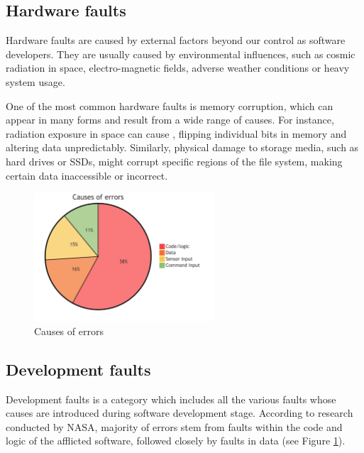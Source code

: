 \subsection{Hardware faults}

Hardware faults are caused by external factors beyond our control as software developers. They are usually caused by environmental influences, such as cosmic radiation in space, electro-magnetic fields, adverse weather conditions or heavy system usage.

One of the most common hardware faults is memory corruption, which can appear in many forms and result from a wide range of causes. For instance, radiation exposure in space can cause , flipping individual bits in memory and altering data unpredictably. Similarly, physical damage to storage media, such as hard drives or SSDs, might corrupt specific regions of the file system, making certain data inaccessible or incorrect.


\begin{figure}[!hbt]
    \centering
    \includegraphics[width=0.6\textwidth]{diagrams/stats/piechart.png}
    \caption{Causes of errors \cite{nasa:stats}}
    \label{fig:nasa_stats}
\end{figure}

\subsection{Development faults}

Development faults is a category which includes all the various faults whose causes are introduced during software development stage. According to research conducted by NASA, majority of errors stem from faults within the code and logic of the afflicted software, followed closely by faults in data \cite{nasa:stats} (see Figure \ref{fig:nasa_stats}).


